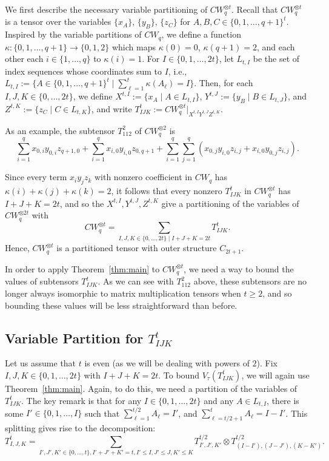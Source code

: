 \documentclass{theoretics}
\begin{document}
We first describe the necessary variable partitioning of $CW_q^{\otimes t}$. Recall that $CW_q^{\otimes t}$ is a tensor over the variables $\{x_A\}$, $\{y_B\}$, $\{z_C\}$ for $A,B,C\in \{0,1,\ldots,q+1\}^{t}$. 
Inspired by the variable partitions of $CW_q$, we define a function $\kappa:\{0,1,\ldots,q+1\}\rightarrow \{0,1,2\}$ which maps $\kappa(0)=0$, $\kappa(q+1)=2$, and each other each $i\in \{1,\ldots,q\}$ to $\kappa(i)=1$. For $I \in \{0,1,\ldots,2t\}$, let $L_{t,I}$ be the set of index sequences whose coordinates sum to $I$, i.e., $L_{t,I} := \{ A \in \{0,1,\ldots,q+1\}^t \mid \sum_{\ell=1}^t \kappa(A_\ell)=I \}$. Then, for each $I,J,K \in \{0,\ldots,2t\}$, we define $X^{t,I} := \{x_A \mid A \in L_{t,I} \}$, $Y^{t,J} := \{y_B \mid B \in L_{t,J} \}$, and $Z^{t,K} := \{z_C \mid C \in L_{t,K} \}$, and write $T^{t}_{IJK} := CW_q^{\otimes t}|_{X^{t,I} Y^{t,J} Z^{t,K}}$.

As an example, the subtensor $T^2_{112}$ of $CW^{\otimes 2}_q$ is $$\sum_{i=1}^q x_{0,i} y_{0,i} z_{q+1,0} + \sum_{i=1}^q x_{i,0} y_{i,0} z_{0,q+1} + \sum_{i=1}^q\sum_{j=1}^q (x_{0,j} y_{i,0} z_{i,j} + x_{i,0} y_{0,j} z_{i,j}).$$


Since every term $x_iy_jz_k$ with nonzero coefficient in $CW_q$ has $\kappa(i)+\kappa(j)+\kappa(k)=2$, it follows that every nonzero $T^t_{IJK}$ in $CW_q^{\otimes t}$ has $I+J+K=2t$, and so the $X^{t,I},Y^{t,J},Z^{t,K}$ give a partitioning of the variables of $CW_q^{\otimes 2t}$ with
$$CW_q^{\otimes t} = \sum_{I,J,K\in \{0,\ldots,2t\} \mid I+J+K=2t} T^t_{IJK}.$$ Hence, $CW_q^{\otimes t}$ is a partitioned tensor with outer structure $C_{2t+1}$.



In order to apply Theorem~\ref{thm:main} to $CW_q^{\otimes t}$, we need a way to bound the values of subtensors $T^t_{IJK}$. As we can see with $T^2_{112}$ above, these subtensors are no longer always isomorphic to matrix multiplication tensors when $t \geq 2$, and so bounding these values will be less straightforward than before.


\subsection{Variable Partition for \texorpdfstring{$T^t_{IJK}$}{TIJKt}} \label{subsec:Tpart}
Let us assume that $t$ is even (as we will be dealing with powers of $2$).
Fix $I,J,K \in \{0,1,\ldots,2t\}$ with $I+J+K=2t$. To bound $V_\tau(T^t_{IJK})$, we will again use Theorem~\ref{thm:main}.  Again, to do this, we need a partition of the variables of $T^t_{IJK}$. The key remark is that for any $I \in \{0,1,\ldots,2t\}$ and any $A \in L_{t,I}$, there is some $I' \in \{0,1,\ldots,I\}$ such that $\sum_{\ell=1}^{t/2} A_\ell = I'$, and $\sum_{\ell=t/2+1}^t A_\ell = I-I'$. This splitting gives rise to the decomposition: 
$$T^{t}_{I,J,K} = \sum_{I',J',K'\in \{0,\ldots,t\}, I'+J'+K'=t, I'\leq I,J'\leq J, K'\leq K} T^{t/2}_{I',J',K'}\otimes T^{t/2}_{(I-I'),(J-J'),(K-K')}.$$
\end{document}
